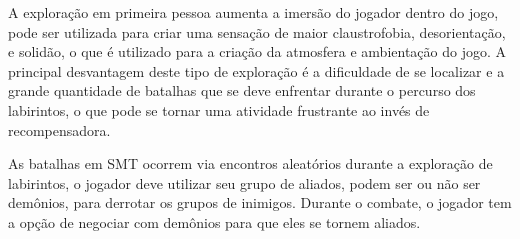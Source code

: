 \documentclass[
	12pt,				%
	openright,			%
	twoside,			%
	a4paper,			%
	english,			%
	french,				%
	spanish,			%
	brazil				%
	]{abntex2}
\begin{document}
A exploração em primeira pessoa aumenta a imersão do jogador dentro do jogo, pode ser utilizada para criar uma sensação de maior claustrofobia, desorientação, e solidão, o que é utilizado para a criação da atmosfera e ambientação do jogo. A principal desvantagem deste tipo de exploração é a dificuldade de se localizar e a grande quantidade de batalhas que se deve enfrentar durante o percurso dos labirintos, o que pode se tornar uma atividade frustrante ao invés de recompensadora.

As batalhas em SMT ocorrem via encontros aleatórios durante a exploração de labirintos, o jogador deve utilizar seu grupo de aliados, podem ser ou não ser demônios, para derrotar os grupos de inimigos. Durante o combate, o jogador tem a opção de negociar com demônios para que eles se tornem aliados.
\end{document}
